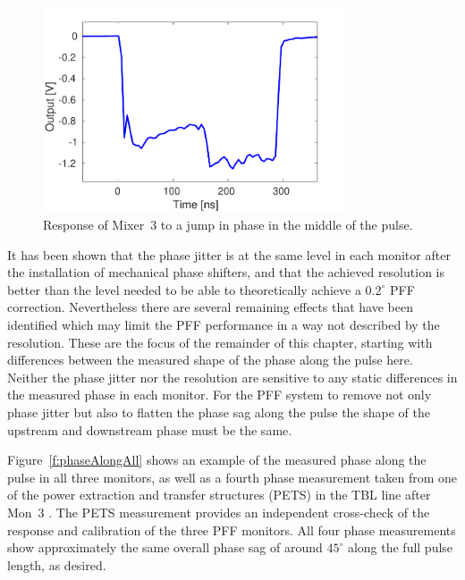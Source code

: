 \begin{figure}
  \centering
  \includegraphics[width=0.8\textwidth]{Figures/phaseMons/bandwidthPlot}
  \caption{Response of Mixer~3 to a jump in phase in the middle of the pulse.}
  \label{f:bandwidthPlot}
\end{figure}

%



It has been shown that the phase jitter is at the same level in each monitor after the installation of mechanical phase shifters, and that the achieved resolution is better than the level needed to be able to theoretically achieve a \(0.2^\circ\) PFF correction. Nevertheless there are several remaining effects that have been identified which may limit the PFF performance in a way not described by the resolution. These are the focus of the remainder of this chapter, starting with differences between the measured shape of the phase along the pulse here. Neither the phase jitter nor the resolution are sensitive to any static differences in the measured phase in each monitor. For the PFF system to remove not only phase jitter but also to flatten the phase sag along the pulse the shape of the upstream and downstream phase must be the same.

Figure~\ref{f:phaseAlongAll} shows an example of the measured phase along the pulse in all three monitors, as well as a fourth phase measurement taken from one of the power extraction and transfer structures (PETS) in the TBL line after Mon~3 \cite{reidarPETS}. The PETS measurement provides an independent cross-check of the response and calibration of the three PFF monitors. All four phase measurements show approximately the same overall phase sag of around \(45^\circ\) along the full pulse length, as desired.


